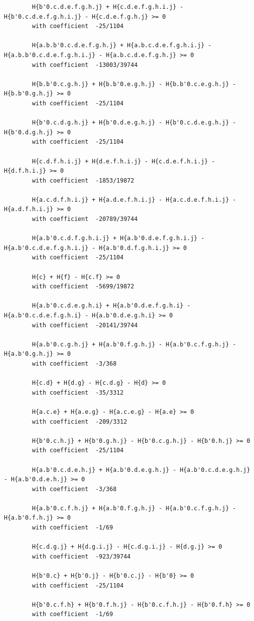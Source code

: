 \documentclass[11pt, a4paper]{kybernetika}
\begin{document}
\begin{verbatim}
		H{b'0.c.d.e.f.g.h.j} + H{c.d.e.f.g.h.i.j} - H{b'0.c.d.e.f.g.h.i.j} - H{c.d.e.f.g.h.j} >= 0
		with coefficient  -25/1104
		
		H{a.b.b'0.c.d.e.f.g.h.j} + H{a.b.c.d.e.f.g.h.i.j} - H{a.b.b'0.c.d.e.f.g.h.i.j} - H{a.b.c.d.e.f.g.h.j} >= 0
		with coefficient  -13003/39744
		
		H{b.b'0.c.g.h.j} + H{b.b'0.e.g.h.j} - H{b.b'0.c.e.g.h.j} - H{b.b'0.g.h.j} >= 0
		with coefficient  -25/1104
		
		H{b'0.c.d.g.h.j} + H{b'0.d.e.g.h.j} - H{b'0.c.d.e.g.h.j} - H{b'0.d.g.h.j} >= 0
		with coefficient  -25/1104
		
		H{c.d.f.h.i.j} + H{d.e.f.h.i.j} - H{c.d.e.f.h.i.j} - H{d.f.h.i.j} >= 0
		with coefficient  -1853/19872
		
		H{a.c.d.f.h.i.j} + H{a.d.e.f.h.i.j} - H{a.c.d.e.f.h.i.j} - H{a.d.f.h.i.j} >= 0
		with coefficient  -20789/39744
		
		H{a.b'0.c.d.f.g.h.i.j} + H{a.b'0.d.e.f.g.h.i.j} - H{a.b'0.c.d.e.f.g.h.i.j} - H{a.b'0.d.f.g.h.i.j} >= 0
		with coefficient  -25/1104
		
		H{c} + H{f} - H{c.f} >= 0
		with coefficient  -5699/19872
		
		H{a.b'0.c.d.e.g.h.i} + H{a.b'0.d.e.f.g.h.i} - H{a.b'0.c.d.e.f.g.h.i} - H{a.b'0.d.e.g.h.i} >= 0
		with coefficient  -20141/39744
		
		H{a.b'0.c.g.h.j} + H{a.b'0.f.g.h.j} - H{a.b'0.c.f.g.h.j} - H{a.b'0.g.h.j} >= 0
		with coefficient  -3/368
		
		H{c.d} + H{d.g} - H{c.d.g} - H{d} >= 0
		with coefficient  -35/3312
		
		H{a.c.e} + H{a.e.g} - H{a.c.e.g} - H{a.e} >= 0
		with coefficient  -209/3312
		
		H{b'0.c.h.j} + H{b'0.g.h.j} - H{b'0.c.g.h.j} - H{b'0.h.j} >= 0
		with coefficient  -25/1104
		
		H{a.b'0.c.d.e.h.j} + H{a.b'0.d.e.g.h.j} - H{a.b'0.c.d.e.g.h.j} - H{a.b'0.d.e.h.j} >= 0
		with coefficient  -3/368
		
		H{a.b'0.c.f.h.j} + H{a.b'0.f.g.h.j} - H{a.b'0.c.f.g.h.j} - H{a.b'0.f.h.j} >= 0
		with coefficient  -1/69
		
		H{c.d.g.j} + H{d.g.i.j} - H{c.d.g.i.j} - H{d.g.j} >= 0
		with coefficient  -923/39744
		
		H{b'0.c} + H{b'0.j} - H{b'0.c.j} - H{b'0} >= 0
		with coefficient  -25/1104
		
		H{b'0.c.f.h} + H{b'0.f.h.j} - H{b'0.c.f.h.j} - H{b'0.f.h} >= 0
		with coefficient  -1/69
		

\end{verbatim}
\end{document}
